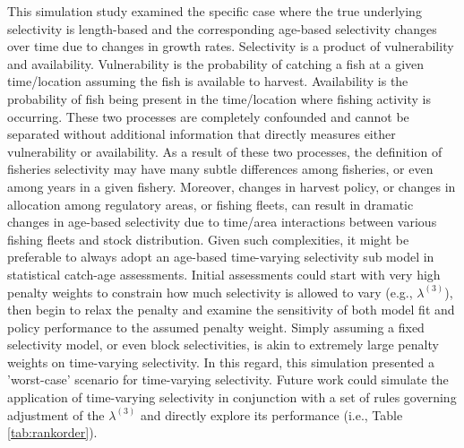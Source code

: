 This simulation study examined the specific case where the true underlying selectivity is length-based and the corresponding age-based selectivity changes over time due to changes in growth rates.  Selectivity is a product of vulnerability and availability.  Vulnerability is the probability of catching a fish at a given time/location assuming the fish is available to harvest.  Availability is the probability of fish being present in the time/location where fishing activity is occurring.  These two processes are completely confounded and cannot be separated without additional information that directly measures either vulnerability or availability.  As a result of these two processes, the definition of fisheries selectivity may have many subtle differences among fisheries, or even among years in a given fishery.  Moreover, changes in harvest policy, or changes in allocation among regulatory areas, or fishing fleets, can result in dramatic changes in age-based selectivity due to time/area interactions between various fishing fleets and stock distribution.  Given such complexities, it might be preferable to always adopt an age-based time-varying selectivity sub model in statistical catch-age assessments. Initial assessments could start with very high penalty weights to constrain how much selectivity is allowed to vary (e.g., $\lambda^{(3)}$), then begin to relax the penalty and examine the sensitivity of both model fit and policy performance to the assumed penalty weight.  Simply assuming a fixed selectivity model, or even block selectivities, is akin to extremely large penalty weights on time-varying selectivity.  In this regard, this simulation presented a 'worst-case' scenario for time-varying selectivity.  Future work could simulate the application of time-varying selectivity in conjunction with a set of rules governing adjustment of the $\lambda^{(3)}$  and directly explore its performance (i.e., Table \ref{tab:rankorder}).


